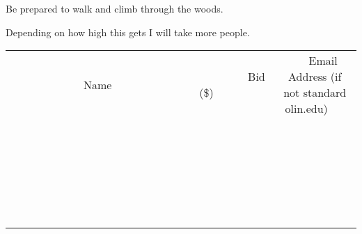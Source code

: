 \documentclass[11pt]{article}
\begin{document}
Be prepared to walk and climb through the woods.

Depending on how high this gets I will take more people. \\[6ex]
\begin{tabular}{c c c}
~~~~~~~~~~~~~Name~~~~~~~~~~~~~ & ~~~~~~~~~Bid (\$)~~~~~~~~~ & ~~~Email Address (if not standard olin.edu)~~~ \\
 & & \\
\hline
 & & \\
\hline
 & & \\
\hline
 & & \\
\hline
 & & \\
\hline
 & & \\
\hline
 & & \\
\hline
 & & \\
\hline
 & & \\
\hline
 & & \\
\hline
 & & \\
\hline
 & & \\
\hline
 & & \\
\hline
 & & \\
\hline
 & & \\
\hline
 & & \\
\hline
 & & \\
\hline
 & & \\
\hline
 & & \\
\hline
 & & \\
\hline
 & & \\
\hline
 & & \\
\hline
 & & \\
\hline
 & & \\
\hline
 & & \\
\hline
 & & \\
\hline
\end{tabular}
\clearpage
\end{document}
